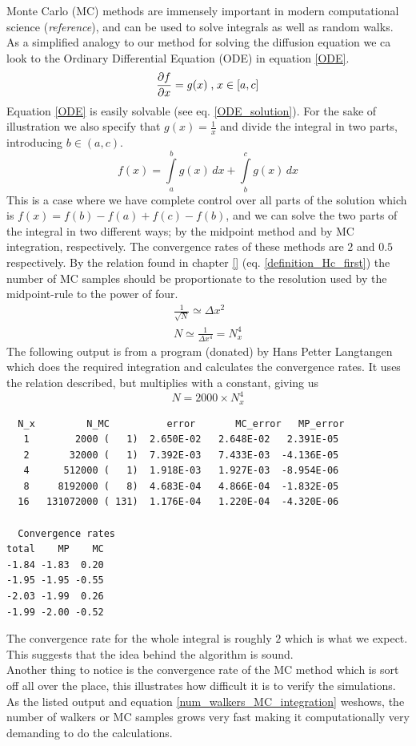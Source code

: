 Monte Carlo (MC) methods are immensely important in modern computational science (\emph{reference}), and can be used to solve integrals as well as random walks. 
As a simplified analogy to our method for solving the diffusion equation we ca look to the Ordinary Differential Equation (ODE) in equation \eqref{ODE}. 
\begin{equation}\label{ODE}
 \frac{\partial f}{\partial x} = g(x)\;\text{,}\; x\in [a,c]
\end{equation}
Equation \eqref{ODE} is easily solvable (see eq. \eqref{ODE_solution}). For the sake of illustration we also specify that $g(x) = \frac{1}{x}$ and divide the integral in two parts, introducing $b\in (a,c)$.
\begin{equation}\label{ODE_solution}
 f(x) = \int\limits_a^b g(x)\,dx + \int\limits_b^c g(x)\,dx
\end{equation}
This is a case where we have complete control over all parts of the solution which is $f(x) = f(b)-f(a) + f(c)-f(b)$, and we can solve the two parts of the integral in two different ways; by the midpoint method and by MC integration, respectively. The convergence rates of these methods are $2$ and $0.5$ respectively. 
By the relation found in chapter \ref{} (eq. \eqref{definition_Hc_first}) the number of MC samples should be proportionate to the resolution used by the midpoint-rule to the power of four. 
\begin{align*}
 \frac{1}{\sqrt{N}} \simeq \Delta x^2 \\
 N \simeq \frac{1}{\Delta x^4} = N_x^4
\end{align*}
The following output is from a program (donated) by Hans Petter Langtangen which does the required integration and calculates the convergence rates. 
It uses the relation described, but multiplies with a constant, giving us 
\begin{equation}\label{num_walkers_MC_integration}
 N = 2000\times N_x^4
\end{equation}
\clearpage
\begin{lstlisting}
  N_x	      N_MC	        error       MC_error   MP_error
   1        2000 (   1)  2.650E-02   2.648E-02   2.391E-05
   2       32000 (   1)  7.392E-03   7.433E-03  -4.136E-05
   4      512000 (   1)  1.918E-03   1.927E-03  -8.954E-06
   8     8192000 (   8)  4.683E-04   4.866E-04  -1.832E-05
  16   131072000 ( 131)  1.176E-04   1.220E-04  -4.320E-06
  
  Convergence rates
total    MP    MC
-1.84 -1.83  0.20
-1.95 -1.95 -0.55
-2.03 -1.99  0.26
-1.99 -2.00 -0.52
\end{lstlisting}
The convergence rate for the whole integral is roughly $2$ which is what we expect. This suggests that the idea behind the algorithm is sound. \\
Another thing to notice is the convergence rate of the MC method which is sort off all over the place, this illustrates how difficult it is to verify the simulations. 
As the listed output and equation \eqref{num_walkers_MC_integration} weshows, the number of walkers or MC samples grows very fast making it computationally very demanding to do the calculations.

